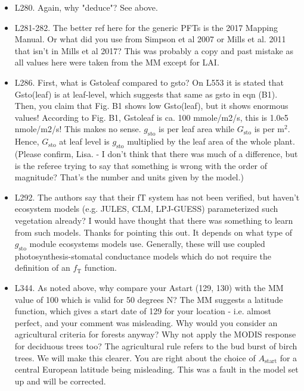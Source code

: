 \documentclass{scrartcl}
\begin{document}
\begin{itemize}
\item {\color{blue}L280. Again, why "deduce"?}
See above.

\item {\color{blue}L281-282. The better ref here for the generic PFTs is the 2017 Mapping Manual. Or what did you use from Simpson et al 2007 or Mills et al. 2011 that isn't in Mills et al 2017?}
This was probably a copy and past mistake as all values here were taken from the MM except for LAI.

\item {\color{blue}L286. First, what is Gstoleaf compared to gsto? On L553 it is stated that Gsto(leaf) is at leaf-level, which suggests that same as gsto in eqn (B1). Then, you claim that Fig. B1 shows low Gsto(leaf), but it shows enormous values! According to Fig. B1, Gstoleaf is ca. 100 mmole/m2/s, this is 1.0e5 nmole/m2/s! This makes no sense.}
$g_\mathrm{sto}$ is per leaf area while $G_\mathrm{sto}$ is per $\mathrm{m}^2$. Hence, $G_\mathrm{sto}$ at leaf level is $g_\mathrm{sto}$ multiplied by the leaf area of the whole plant. (Please confirm, Lisa. - I don't think that there was much of a difference, but is the referee trying to say that something is wrong with the order of magnitude? That's the number and units given by the model.)

\item {\color{blue}L292. The authors say that their fT system has not been verified, but haven't ecosystem models (e.g. JULES, CLM, LPJ-GUESS) parameterized such vegetation already? I would have thought that there was something to learn from such models.}
Thanks for pointing this out. It depends on what type of $g_\mathrm{sto}$ module ecosystems models use. Generally, these will use coupled photosynthesis-stomatal conductance models which do not require the definition of an $f_\mathrm{T}$ function.

\item {\color{blue}L344. As noted above, why compare your Astart (129, 130) with the MM value of 100 which is valid for 50 degrees N? The MM suggests a latitude function, which gives a start date of 129 for your location - i.e. almost perfect, and your comment was misleading. Why would you consider an agricultural criteria for forests anyway? Why not apply the MODIS response for deciduous trees too?} The agricultural rule refers to the bud burst of birch trees. We will make this clearer. You are right about the choice of $A_\mathrm{start}$ for a central European latitude being misleading. This was a fault in the model set up and will be corrected.


\end{itemize}
\end{document}
